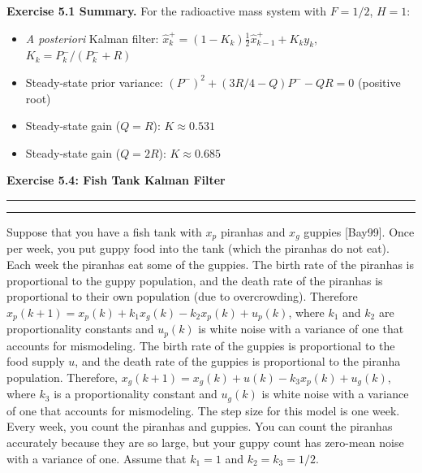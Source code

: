 \documentclass[12pt]{article}
\newcommand{\question}[1]{%
  \clearpage
  \vspace{0.5cm}
  {\noindent\normalsize \textbf{#1}}
  \vspace{0.2cm}
  \hrule
  \vspace{0.1cm}
  \hrule
  \vspace{0.3cm}
}
\begin{document}
\begin{resultsbox}

\textbf{Exercise 5.1 Summary.} For the radioactive mass system with $F = 1/2$, $H = 1$:
\begin{itemize}[nosep]
\item \textit{A posteriori} Kalman filter: $\hat{x}_k^+ = (1-K_k)\frac{1}{2}\hat{x}_{k-1}^+ + K_k y_k$, \; $K_k = P_k^-/(P_k^- + R)$
\item Steady-state prior variance: $(P^-)^2 + (3R/4 - Q)P^- - QR = 0$ (positive root)
\item Steady-state gain ($Q = R$): $K \approx 0.531$
\item Steady-state gain ($Q = 2R$): $K \approx 0.685$
\end{itemize}

\end{resultsbox}

\question{Exercise 5.4: Fish Tank Kalman Filter}\label{ex:5.4}
Suppose that you have a fish tank with $x_p$ piranhas and $x_g$ guppies [Bay99]. Once per week, you put guppy food into the tank (which the piranhas do not eat). Each week the piranhas eat some of the guppies. The birth rate of the piranhas is proportional to the guppy population, and the death rate of the piranhas is proportional to their own population (due to overcrowding). Therefore $x_p(k+1) = x_p(k) + k_1 x_g(k) - k_2 x_p(k) + u_p(k)$, where $k_1$ and $k_2$ are proportionality constants and $u_p(k)$ is white noise with a variance of one that accounts for mismodeling. The birth rate of the guppies is proportional to the food supply $u$, and the death rate of the guppies is proportional to the piranha population. Therefore, $x_g(k+1) = x_g(k) + u(k) - k_3 x_p(k) + u_g(k)$, where $k_3$ is a proportionality constant and $u_g(k)$ is white noise with a variance of one that accounts for mismodeling. The step size for this model is one week. Every week, you count the piranhas and guppies. You can count the piranhas accurately because they are so large, but your guppy count has zero-mean noise with a variance of one. Assume that $k_1 = 1$ and $k_2 = k_3 = 1/2$.
\end{document}
